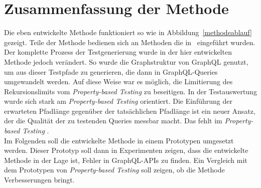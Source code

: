 \section{Zusammenfassung der Methode}

Die eben entwickelte Methode funktioniert so wie in Abbildung~\ref{methodeablauf} gezeigt.
Teile der Methode bedienen sich an Methoden die in~\cite{property-based-testing} eingeführt wurden.
Der komplette Prozess der Testgenerierung wurde in der hier entwickelten Methode jedoch verändert.
So wurde die Graphstruktur von GraphQL genutzt, um aus dieser Testpfade zu generieren, die dann in GraphQL-Queries umgewandelt werden.
Auf diese Weise war es möglich, die Limitierung des Rekursionslimits vom \textit{Property-based Testing} zu beseitigen.
In der Testauswertung wurde sich stark am \textit{Property-based Testing} orientiert.
Die Einführung der erwarteten Pfadlänge gegenüber der tatsächlichen Pfadlänge ist ein neuer Ansatz, der die Qualität der zu testenden Queries
messbar macht.
Das fehlt im \textit{Property-based Testing} .
\\


Im Folgenden soll die entwickelte Methode in einem Prototypen umgesetzt werden.
Dieser Prototyp soll dann in Experimenten zeigen, dass die entwickelte Methode in der Lage ist, Fehler in GraphQL-APIs zu finden.
Ein Vergleich mit dem Prototypen von \textit{Property-based Testing} soll zeigen, ob die Methode Verbesserungen bringt.







